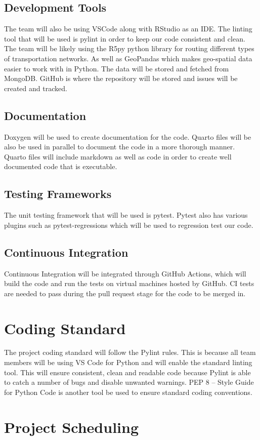 \documentclass{article}
\begin{document}
\subsection{Development Tools}
 The team will also be using VSCode along with RStudio as an IDE. The linting tool that will be used is pylint in order to keep our code consistent and clean. The team will be likely using the R5py python library for routing different types of transportation networks. As well as GeoPandas which makes geo-spatial data easier to work with in Python. The data will be stored and fetched from MongoDB. GitHub is where the repository will be stored and issues will be created and tracked.
 
\subsection{Documentation}
Doxygen will be used to create documentation for the code. Quarto files will be also be used in parallel to document the code in a more thorough manner. Quarto files will include markdown as well as code in order to create well documented code that is executable.

\subsection{Testing Frameworks}
The unit testing framework that will be used is pytest. Pytest also has various plugins such as pytest-regressions which will be used to regression test our code.
 
\subsection{Continuous Integration}
Continuous Integration will be integrated through GitHub Actions, which will build the code and run the tests on virtual machines hosted by GitHub. CI tests are needed to pass during the pull request stage for the code to be merged in.

\section{Coding Standard}
The project coding standard will follow the Pylint rules. This is because all team members will be using VS Code for Python and will enable the standard linting tool. This will ensure consistent, clean and readable code because Pylint is able to catch a number of bugs and disable unwanted warnings. %
PEP 8 – Style Guide for Python Code is another tool be used to ensure standard coding conventions. %

\section{Project Scheduling}

\end{document}
